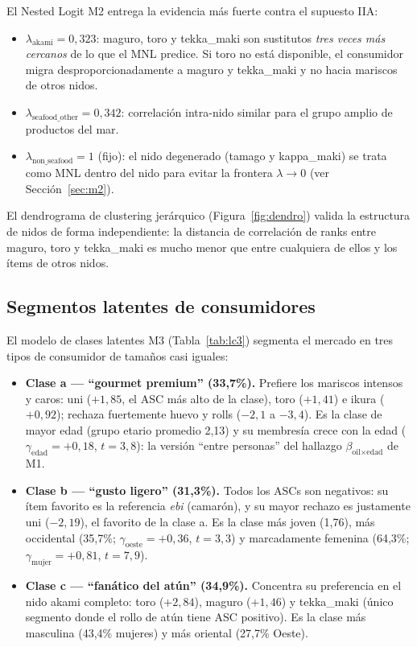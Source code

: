 \documentclass[12pt,a4paper]{article}
\begin{document}
El Nested Logit M2 entrega la evidencia más fuerte contra el supuesto IIA:
\begin{itemize}[nosep]
  \item $\lambda_{\text{akami}} = 0{,}323$: maguro, toro y tekka\_maki son sustitutos \emph{tres veces más cercanos} de lo que el MNL predice. Si toro no está disponible, el consumidor migra desproporcionadamente a maguro y tekka\_maki y no hacia mariscos de otros nidos.
  \item $\lambda_{\text{seafood\_other}} = 0{,}342$: correlación intra-nido similar para el grupo amplio de productos del mar.
  \item $\lambda_{\text{non\_seafood}} = 1$ (fijo): el nido degenerado (tamago y kappa\_maki) se trata como MNL dentro del nido para evitar la frontera $\lambda \to 0$ (ver Sección~\ref{sec:m2}).
\end{itemize}
El dendrograma de clustering jerárquico (Figura~\ref{fig:dendro}) valida la estructura de nidos de forma independiente: la distancia de correlación de ranks entre maguro, toro y tekka\_maki es mucho menor que entre cualquiera de ellos y los ítems de otros nidos.

\subsection{Segmentos latentes de consumidores}
\label{sec:lc_interp}

El modelo de clases latentes M3 (Tabla~\ref{tab:lc3}) segmenta el mercado en tres tipos de consumidor de tamaños casi iguales:
\begin{itemize}[nosep]
  \item \textbf{Clase a --- ``gourmet premium'' (33,7\%).} Prefiere los mariscos intensos y caros: uni ($+1{,}85$, el ASC más alto de la clase), toro ($+1{,}41$) e ikura ($+0{,}92$); rechaza fuertemente huevo y rolls ($-2{,}1$ a $-3{,}4$). Es la clase de mayor edad (grupo etario promedio 2,13) y su membresía crece con la edad ($\gamma_{\text{edad}} = +0{,}18$, $t = 3{,}8$): la versión ``entre personas'' del hallazgo $\beta_{\text{oil}\times\text{edad}}$ de M1.
  \item \textbf{Clase b --- ``gusto ligero'' (31,3\%).} Todos los ASCs son negativos: su ítem favorito es la referencia \emph{ebi} (camarón), y su mayor rechazo es justamente uni ($-2{,}19$), el favorito de la clase a. Es la clase más joven (1,76), más occidental (35,7\%; $\gamma_{\text{oeste}} = +0{,}36$, $t = 3{,}3$) y marcadamente femenina (64,3\%; $\gamma_{\text{mujer}} = +0{,}81$, $t = 7{,}9$).
  \item \textbf{Clase c --- ``fanático del atún'' (34,9\%).} Concentra su preferencia en el nido akami completo: toro ($+2{,}84$), maguro ($+1{,}46$) y tekka\_maki (único segmento donde el rollo de atún tiene ASC positivo). Es la clase más masculina (43,4\% mujeres) y más oriental (27,7\% Oeste).
\end{itemize}
\end{document}
